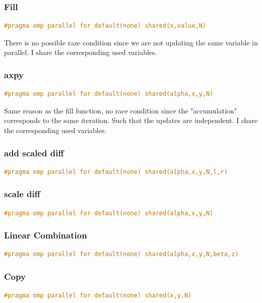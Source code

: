 \documentclass[unicode,11pt,a4paper,oneside,numbers=endperiod,openany]{scrartcl}
\begin{document}
\subsubsection{Fill}
\begin{lstlisting}[language=C]
#pragma omp parallel for default(none) shared(x,value,N)
\end{lstlisting}
There is no possible raze condition since we are not updating the same variable in parallel.
I share the corresponding used variables. 

\subsubsection{axpy}
\begin{lstlisting}[language=C]
#pragma omp parallel for default(none) shared(alpha,x,y,N)
\end{lstlisting}
Same reason as the fill function, no race condition since 
the "accumulation" corresponds to the same iteration. Such that 
the updates are independent.
I share the corresponding used variables. 

\subsubsection{add scaled diff}
\begin{lstlisting}[language=C]
#pragma omp parallel for default(none) shared(alpha,x,y,N,l,r)
\end{lstlisting}

\subsubsection{scale diff}
\begin{lstlisting}[language=C]
#pragma omp parallel for default(none) shared(alpha,x,y,N)
\end{lstlisting}

\subsubsection{Linear Combination}
\begin{lstlisting}[language=C]
#pragma omp parallel for default(none) shared(alpha,x,y,N,beta,z)
\end{lstlisting}

\subsubsection{Copy}
\begin{lstlisting}[language=C]
#pragma omp parallel for default(none) shared(x,y,N)
\end{lstlisting}
\end{document}
